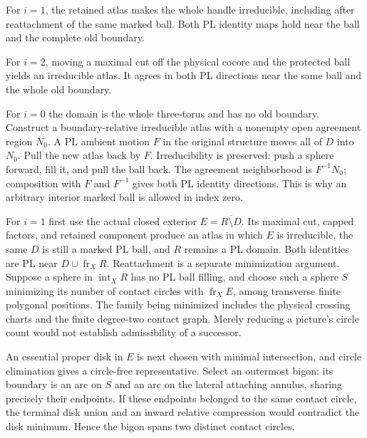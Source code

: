 \begin{theorem}
\label{thm:prime-index-one}
For $i=1$, the retained atlas makes the whole handle irreducible,
including after reattachment of the same marked ball. Both PL identity
maps hold near the ball and the complete old boundary.
\end{theorem}

\begin{theorem}
\label{thm:prime-index-two}
For $i=2$, moving a maximal cut off the physical cocore and the protected
ball yields an irreducible atlas. It agrees in both PL directions near
the same ball and the whole old boundary.
\end{theorem}

For $i=0$ the domain is the whole three-torus and has no old boundary.
Construct a boundary-relative irreducible atlas with a nonempty open
agreement region $N_0$. A PL ambient motion $F$ in the original structure
moves all of $D$ into $N_0$. Pull the new atlas back by $F$. Irreducibility
is preserved: push a sphere forward, fill it, and pull the ball back.
The agreement neighborhood is $F^{-1}N_0$; composition with $F$ and
$F^{-1}$ gives both PL identity directions. This is why an arbitrary
interior marked ball is allowed in index zero.

For $i=1$ first use the actual closed exterior $E=\overline{R\setminus D}$.
Its maximal cut, capped factors, and retained component produce an atlas
in which $E$ is irreducible, the same $D$ is still a marked PL ball, and
$R$ remains a PL domain. Both identities are PL near
$D\cup\operatorname{fr}_X R$. Reattachment is a separate minimization
argument. Suppose a sphere in $\operatorname{int}_X R$ has no PL ball
filling, and choose such a sphere $S$ minimizing its number of contact
circles with $\operatorname{fr}_X E$, among transverse finite polygonal
positions. The family being minimized includes the physical crossing
charts and the finite degree-two contact graph. Merely reducing a
picture's circle count would not establish admissibility of a successor.

An essential proper disk in $E$ is next chosen with minimal intersection,
and circle elimination gives a circle-free representative. Select an
outermost bigon: its boundary is an arc on $S$ and an arc on the lateral
attaching annulus, sharing precisely their endpoints. If these endpoints
belonged to the same contact circle, the terminal disk union and an
inward relative compression would contradict the disk minimum. Hence
the bigon spans two distinct contact circles.

